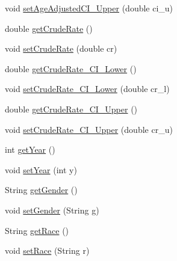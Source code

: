 \begin{DoxyCompactItemize}
\item 
void \mbox{\hyperlink{classbridges_1_1data__src__dependent_1_1_cancer_incidence_aeb386486bfbd96ba9ab689b7d95d4522}{set\+Age\+Adjusted\+C\+I\+\_\+\+Upper}} (double ci\+\_\+u)
\item 
double \mbox{\hyperlink{classbridges_1_1data__src__dependent_1_1_cancer_incidence_afc2ddb3099dffc46371ad7188278501d}{get\+Crude\+Rate}} ()
\item 
void \mbox{\hyperlink{classbridges_1_1data__src__dependent_1_1_cancer_incidence_a64a737fd7481262650efd596c508ffd6}{set\+Crude\+Rate}} (double cr)
\item 
double \mbox{\hyperlink{classbridges_1_1data__src__dependent_1_1_cancer_incidence_a8c410730b03abc78395e75b5024d495e}{get\+Crude\+Rate\+\_\+\+C\+I\+\_\+\+Lower}} ()
\item 
void \mbox{\hyperlink{classbridges_1_1data__src__dependent_1_1_cancer_incidence_a72e3960af58f32d26e32f49ada2f1555}{set\+Crude\+Rate\+\_\+\+C\+I\+\_\+\+Lower}} (double cr\+\_\+l)
\item 
double \mbox{\hyperlink{classbridges_1_1data__src__dependent_1_1_cancer_incidence_a4ca1ceed275ab6371f861d3a03975f15}{get\+Crude\+Rate\+\_\+\+C\+I\+\_\+\+Upper}} ()
\item 
void \mbox{\hyperlink{classbridges_1_1data__src__dependent_1_1_cancer_incidence_a99e25dd53093badf350b06b7e0c8b725}{set\+Crude\+Rate\+\_\+\+C\+I\+\_\+\+Upper}} (double cr\+\_\+u)
\item 
int \mbox{\hyperlink{classbridges_1_1data__src__dependent_1_1_cancer_incidence_aaff714019154afa796d54ed57ffc9492}{get\+Year}} ()
\item 
void \mbox{\hyperlink{classbridges_1_1data__src__dependent_1_1_cancer_incidence_aa5524736b76d67f1248d1a05d9f596a9}{set\+Year}} (int y)
\item 
String \mbox{\hyperlink{classbridges_1_1data__src__dependent_1_1_cancer_incidence_a2c3cbe65d89827c167f15314b8b088b3}{get\+Gender}} ()
\item 
void \mbox{\hyperlink{classbridges_1_1data__src__dependent_1_1_cancer_incidence_a217681578e13197e1d177932c73ea80f}{set\+Gender}} (String g)
\item 
String \mbox{\hyperlink{classbridges_1_1data__src__dependent_1_1_cancer_incidence_a18de1c14d36cd7656555c8465ea8a009}{get\+Race}} ()
\item 
void \mbox{\hyperlink{classbridges_1_1data__src__dependent_1_1_cancer_incidence_a8c26c4358561453f3d2ca3a463eed872}{set\+Race}} (String r)
\item 

\end{DoxyCompactItemize}
